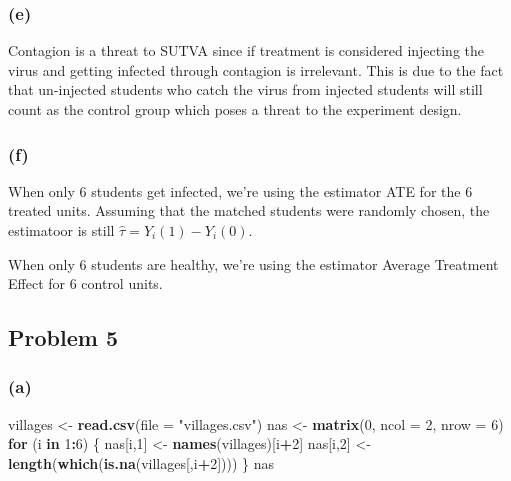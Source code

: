 \documentclass[]{article}
\newenvironment{Shaded}{\begin{snugshade}}{\end{snugshade}}
\newcommand{\ControlFlowTok}[1]{\textcolor[rgb]{0.13,0.29,0.53}{\textbf{#1}}}
\newcommand{\DataTypeTok}[1]{\textcolor[rgb]{0.13,0.29,0.53}{#1}}
\newcommand{\DecValTok}[1]{\textcolor[rgb]{0.00,0.00,0.81}{#1}}
\newcommand{\KeywordTok}[1]{\textcolor[rgb]{0.13,0.29,0.53}{\textbf{#1}}}
\newcommand{\NormalTok}[1]{#1}
\newcommand{\OperatorTok}[1]{\textcolor[rgb]{0.81,0.36,0.00}{\textbf{#1}}}
\newcommand{\StringTok}[1]{\textcolor[rgb]{0.31,0.60,0.02}{#1}}
\begin{document}
\hypertarget{e}{%
\subsubsection{(e)}\label{e}}

Contagion is a threat to SUTVA since if treatment is considered
injecting the virus and getting infected through contagion is
irrelevant. This is due to the fact that un-injected students who catch
the virus from injected students will still count as the control group
which poses a threat to the experiment design.

\hypertarget{f}{%
\subsubsection{(f)}\label{f}}

When only 6 students get infected, we're using the estimator ATE for the
6 treated units. Assuming that the matched students were randomly
chosen, the estimatoor is still \(\hat{\tau} = Y_i(1) - Y_i(0)\).

When only 6 students are healthy, we're using the estimator Average
Treatment Effect for 6 control units.

\hypertarget{problem-5}{%
\subsection{Problem 5}\label{problem-5}}

\hypertarget{a-3}{%
\subsubsection{(a)}\label{a-3}}

\begin{Shaded}
\begin{Highlighting}[]
\NormalTok{villages <-}\StringTok{ }\KeywordTok{read.csv}\NormalTok{(}\DataTypeTok{file =} \StringTok{"villages.csv"}\NormalTok{)}
\NormalTok{nas <-}\StringTok{ }\KeywordTok{matrix}\NormalTok{(}\DecValTok{0}\NormalTok{, }\DataTypeTok{ncol =} \DecValTok{2}\NormalTok{, }\DataTypeTok{nrow =} \DecValTok{6}\NormalTok{)}
\ControlFlowTok{for}\NormalTok{ (i }\ControlFlowTok{in} \DecValTok{1}\OperatorTok{:}\DecValTok{6}\NormalTok{) \{}
\NormalTok{  nas[i,}\DecValTok{1}\NormalTok{] <-}\StringTok{ }\KeywordTok{names}\NormalTok{(villages)[i}\OperatorTok{+}\DecValTok{2}\NormalTok{]}
\NormalTok{  nas[i,}\DecValTok{2}\NormalTok{] <-}\StringTok{ }\KeywordTok{length}\NormalTok{(}\KeywordTok{which}\NormalTok{(}\KeywordTok{is.na}\NormalTok{(villages[,i}\OperatorTok{+}\DecValTok{2}\NormalTok{])))}
\NormalTok{\}}
\NormalTok{nas}
\end{Highlighting}
\end{Shaded}
\end{document}
